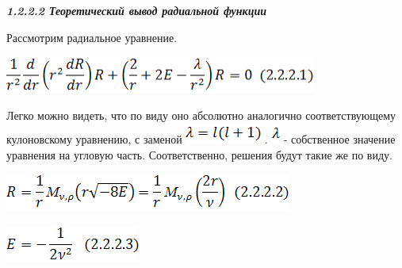 \documentclass{article}
\begin{document}
\label{HToc453749985}

\vspace{28pt}
\baselineskip=13pt
{\color{color17} \textit{\textbf{1.2.2.2 Теоретический вывод 
радиальной функции}}}

\vspace{10pt}
\baselineskip=18pt
{\large{}Рассмотрим радиальное уравнение. }

\vspace{10pt}
\includegraphics[width=290pt, height=35pt, keepaspectratio=true]{3-fig011.png}

\vspace{28pt}
{\large{}Легко можно видеть, что по виду оно абсолютно 
аналогично соответствующему кулоновскому 
уравнению, с заменой }
\includegraphics[width=71pt, height=19pt, keepaspectratio=true]{3-fig012.png}
{\large{}. }
\includegraphics[width=8pt, height=19pt, keepaspectratio=true]{3-fig013.png}
{\large{} - собственное значение уравнения на угловую 
часть. Соответственно, решения будут такие 
же по виду. }

\vspace{10pt}
\includegraphics[width=267pt, height=35pt, keepaspectratio=true]{3-fig014.png}

\vspace{28pt}
\includegraphics[width=125pt, height=34pt, keepaspectratio=true]{3-fig015.png}
\end{document}
